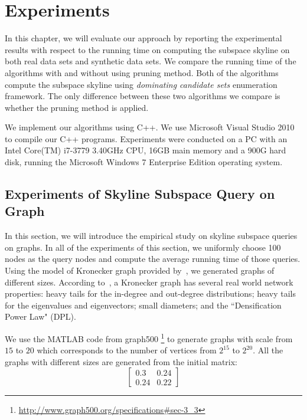 
%
%

\chapter{Experiments}
\label{ch:exp}

In this chapter, we will evaluate our approach by reporting the experimental results with respect to the running time on computing the subspace skyline on both real data sets and synthetic data sets. We compare the running time of the algorithms with and without using pruning method. Both of the algorithms compute the subspace skyline using \emph{dominating candidate sets} enumeration framework. The only difference between these two algorithms we compare is whether the pruning method is applied.

We implement our algorithms using C++. We use Microsoft Visual Studio 2010 to compile our C++ programs. Experiments were conducted on a PC with an Intel Core(TM) i7-3779 3.40GHz CPU, 16GB main memory and a 900G hard disk, running the Microsoft Windows 7 Enterprise Edition operating system.

\section{Experiments of Skyline Subspace Query on Graph}
\label{ch:exp:graph}
In this section, we will introduce the empirical study on skyline subspace queries on graphs. In all of the experiments of this section, we uniformly choose 100 nodes as the query nodes and compute the average running time of those queries.
Using the model of Kronecker graph provided by~\cite{leskovec2005realistic}, we generated graphs of different sizes.
According to~\cite{leskovec2005realistic}, a Kronecker graph has several real world network properties:
heavy tails for the in-degree and out-degree distributions;
heavy tails for the eigenvalues and eigenvectors;
small diameters; and the ``Densification Power Law" (DPL).

We use the MATLAB code from graph500 \footnote{\url{http://www.graph500.org/specifications\#sec-3_3}} to generate graphs with scale from $15$ to $20$ which corresponds to the number of vertices from $2^{15}$ to $2^{20}$. All the graphs with different sizes are generated from the initial matrix:
\begin{equation}
\begin{bmatrix}
0.3 & 0.24\\ 
0.24 & 0.22
\end{bmatrix}
\end{equation}

